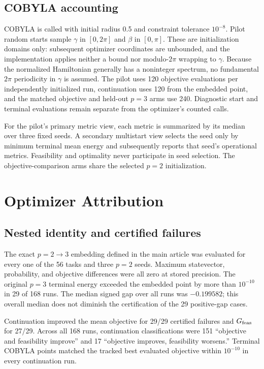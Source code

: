 \subsection{COBYLA accounting}

COBYLA is called with initial radius 0.5 and constraint tolerance $10^{-8}$.
Pilot random starts sample $\gamma$ in $[0,2\pi]$ and $\beta$ in
$[0,\pi]$. These are initialization domains only: subsequent optimizer
coordinates are unbounded, and the implementation applies neither a bound nor
modulo-$2\pi$ wrapping to $\gamma$. Because the normalized Hamiltonian
generally has a noninteger spectrum, no fundamental $2\pi$ periodicity in
$\gamma$ is assumed. The pilot uses 120 objective evaluations per
independently initialized run, continuation uses 120 from the embedded point,
and the matched objective and held-out $p=3$ arms use 240. Diagnostic start and
terminal evaluations remain separate from the optimizer's counted calls.

For the pilot's primary metric view, each metric is summarized by its median
over three fixed seeds. A secondary multistart view selects the seed only by
minimum terminal mean energy and subsequently reports that seed's operational
metrics. Feasibility and optimality never participate in seed selection. The
objective-comparison arms share the selected $p=2$ initialization.

\section{Optimizer Attribution}
\label{app:optimizer-attribution}

\subsection{Nested identity and certified failures}

The exact $p=2\to3$ embedding defined in the main article was evaluated for every one of the
56 tasks and three $p=2$ seeds. Maximum statevector, probability, and objective
differences were all zero at stored precision. The original $p=3$ terminal
energy exceeded the embedded point by more than $10^{-10}$ in 29 of 168 runs.
The median signed gap over all runs was $-0.199582$; this overall median does
not diminish the certification of the 29 positive-gap cases.

Continuation improved the mean objective for 29/29 certified failures and
$G_{\mathrm{feas}}$ for 27/29. Across all 168 runs, continuation classifications were
151 ``objective and feasibility improve'' and 17 ``objective improves,
feasibility worsens.'' Terminal COBYLA points matched the tracked best
evaluated objective within $10^{-10}$ in every continuation run.

